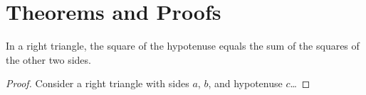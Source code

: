 \section{Theorems and Proofs}
\begin{theorem}
In a right triangle, the square of the hypotenuse equals the sum of 
the squares of the other two sides.
\end{theorem}

\begin{proof}
Consider a right triangle with sides $a$, $b$, and hypotenuse $c$\ldots
\end{proof}